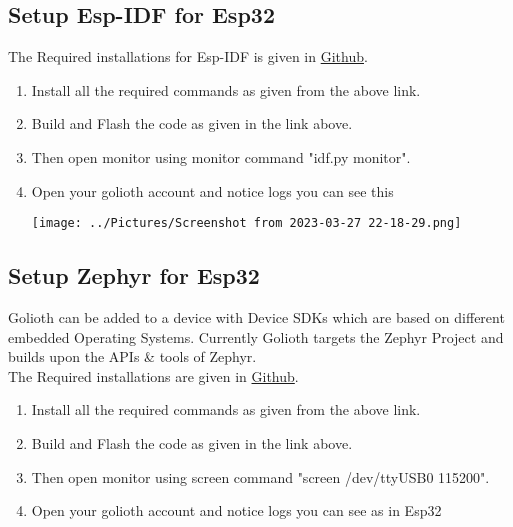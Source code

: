 \documentclass[journal,5pt,twocolumn]{IEEEtran}
\begin{document}
\subsection{\textbf{Setup Esp-IDF for Esp32}}
The Required installations for Esp-IDF is given in {\href{https://github.com/KrishnaYadati/Golioth-PSoC/blob/main/docs/esp-idf_installation.txt}{Github}}.
\begin{enumerate}
\item Install all the required commands as given from the above link.
\item Build and Flash the code as given in the link above.
\item Then open monitor using monitor command "idf.py monitor".
\item Open your golioth account and notice logs you can see this\\
\vspace{5mm}

  \texttt{[image: ../Pictures/Screenshot from 2023-03-27 22-18-29.png]} 
  
\end{enumerate}
\subsection{\textbf{Setup Zephyr for Esp32}}
Golioth can be added to a device with Device SDKs which are based on different embedded Operating Systems. Currently Golioth targets the Zephyr Project and builds upon the APIs \& tools of Zephyr.\\
The Required installations are given in {\href{https://github.com/KrishnaYadati/Golioth-PSoC/blob/main/docs/zephyr-esp32_installation.txt}{Github}}.
\begin{enumerate}
\item Install all the required commands as given from the above link.
\item Build and Flash the code as given in the link above.
\item Then open monitor using screen command "screen /dev/ttyUSB0 115200".
\item Open your golioth account and notice logs you can see as in Esp32\\

  
\end{enumerate}
\end{document}
